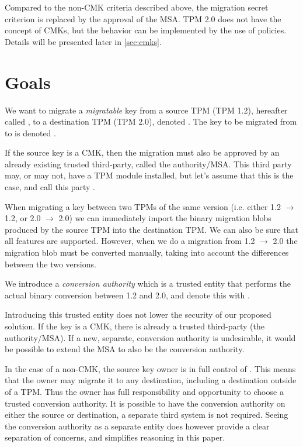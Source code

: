 {Compared to the non-CMK criteria described above, the migration secret criterion is replaced by the approval of the MSA. TPM 2.0 does not have the concept of CMKs, but the behavior can be implemented by the use of policies. Details will be presented later in \autoref{sec:cmks}.

\section{Goals} \label{sec:goals}
We want to migrate a \emph{migratable} key from a source TPM (TPM 1.2), hereafter called \tpms{}, to a destination TPM (TPM 2.0), denoted \tpmd{}. The key to be migrated from \tpms{} to \tpmd{} is denoted \ek{}.

If the source key is a CMK, then the migration must also be approved by an already existing trusted third-party, called the authority/MSA. This third party may, or may not, have a TPM module installed, but let's assume that this is the case, and call this party \tpma{}.

When migrating a key between two TPMs of the same version (i.e. either 1.2 $\rightarrow$ 1.2, or 2.0 $\rightarrow$ 2.0) we can immediately import the binary migration blobs produced by the source TPM into the destination TPM. We can also be sure that all features are supported. However, when we do a migration from 1.2 $\rightarrow$ 2.0 the migration blob must be converted manually, taking into account the differences between the two versions.

We introduce a \emph{conversion authority} which is a trusted entity that performs the actual binary conversion between 1.2 and 2.0, and denote this with \ca{}.

Introducing this trusted entity does not lower the security of our proposed solution. If the key \ek{} is a CMK, there is already a trusted third-party (the authority/MSA). If a new, separate, conversion authority is undesirable, it would be possible to extend the MSA to also be the conversion authority.

In the case of a non-CMK, the source key owner is in full control of \ek{}. This means that the owner may migrate it to any destination, including a destination outside of a TPM. Thus the owner has full responsibility and opportunity to choose a trusted conversion authority. It is possible to have the conversion authority on either the source or destination, a separate third system is not required. Seeing the conversion authority as a separate entity does however provide a clear separation of concerns, and simplifies reasoning in this paper.

}
